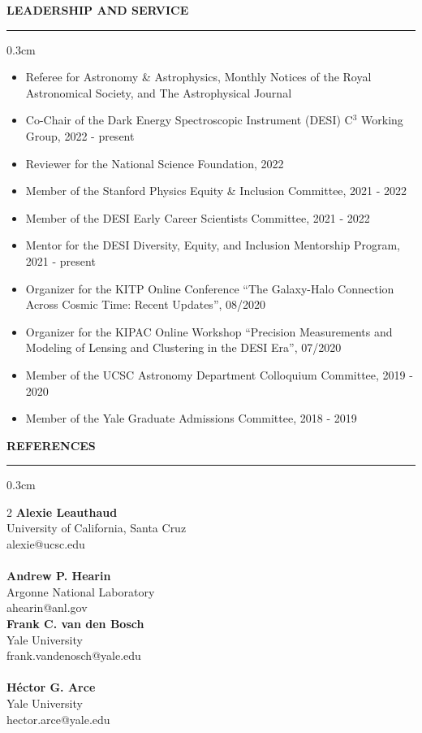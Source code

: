\documentclass[12pt]{article}
\renewenvironment{section}[1]
  {
  \medskip
  {\color{yaleblue} \MakeUppercase{\bf #1}}
  \smallskip
  \hrule
  \medskip
  \begin{adjustwidth}{0.3cm}{}
  }
  {
  \end{adjustwidth}
  }
\newcommand{\entry}[3]{{\bf #1} \hfill {#2} \\ {#3}}
\begin{document}
\begin{section}{Leadership and Service}
  \begin{itemize}[leftmargin=0.5cm, topsep=0pt, itemsep=0pt, partopsep=0pt, parsep=0pt]
    \item Referee for Astronomy \& Astrophysics, Monthly Notices of the Royal Astronomical Society, and The Astrophysical Journal
    \item Co-Chair of the Dark Energy Spectroscopic Instrument (DESI) C$^3$ Working Group, 2022 - present
    \item Reviewer for the National Science Foundation, 2022
    \item Member of the Stanford Physics Equity \& Inclusion Committee, 2021 - 2022
    \item Member of the DESI Early Career Scientists Committee, 2021 - 2022
    \item Mentor for the DESI Diversity, Equity, and Inclusion Mentorship Program, 2021 - present
    \item Organizer for the KITP Online Conference ``The Galaxy-Halo Connection Across Cosmic Time: Recent Updates'', 08/2020
    \item Organizer for the KIPAC Online Workshop ``Precision Measurements and Modeling of Lensing and Clustering in the DESI Era'', 07/2020
    \item Member of the UCSC Astronomy Department Colloquium Committee, 2019 - 2020
    \item Member of the Yale Graduate Admissions Committee, 2018 - 2019
  \end{itemize}
\end{section}

\begin{section}{References}
    \begin{multicols*}{2}
    \entry{Alexie Leauthaud}{}{University of California, Santa Cruz\\alexie@ucsc.edu} \\ \\
    \entry{Andrew P. Hearin}{}{Argonne National Laboratory\\ahearin@anl.gov} \columnbreak \\
    \entry{Frank C. van den Bosch}{}{Yale University\\frank.vandenosch@yale.edu} \\ \\
    \entry{H\'{e}ctor G. Arce}{}{Yale University\\hector.arce@yale.edu}
    \end{multicols*}
\end{section}
\end{document}

